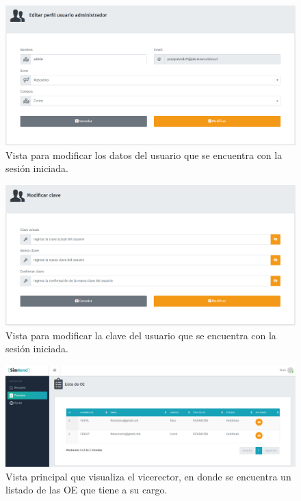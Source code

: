 \begin{figure}[h]
    \centering
    \includegraphics[width=1\textwidth]{Imagenes/EditarPerfil.PNG}
    \caption{\label{fig: EditarPerfil}Vista para modificar los datos del usuario que se encuentra con la sesión iniciada.}
\end{figure}

\begin{figure}[h]
    \centering
    \includegraphics[width=1\textwidth]{Imagenes/ModificarClave.PNG}
    \caption{\label{fig: EditarClave}Vista para modificar la clave del usuario que se encuentra con la sesión iniciada.}
\end{figure}

\begin{figure}[h]
    \centering
    \includegraphics[width=1\textwidth]{Imagenes/PrincipalVicerector.PNG}
    \caption{\label{fig: PrincipalVicerector}Vista principal que visualiza el vicerector, en donde se encuentra un listado de las OE que tiene a su cargo.}
\end{figure}